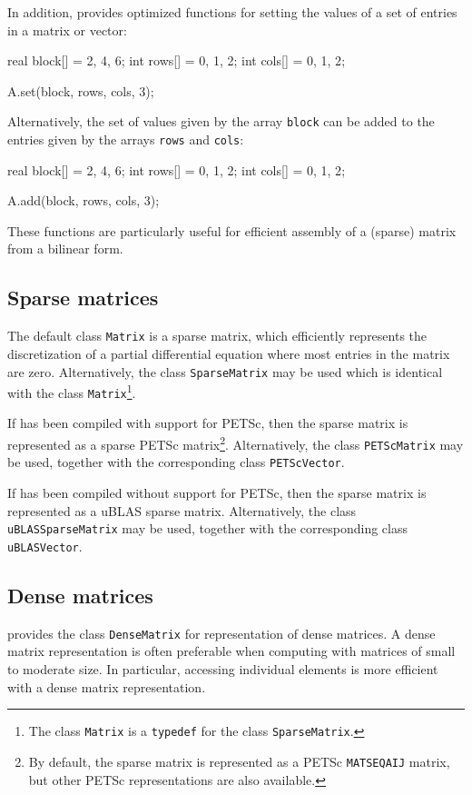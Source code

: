 In addition, \dolfin{} provides optimized functions for setting the
values of a set of entries in a matrix or vector:
\begin{code}
real block[] = {2, 4, 6};
int rows[] = {0, 1, 2};
int cols[] = {0, 1, 2};
  
A.set(block, rows, cols, 3);
\end{code}
Alternatively, the set of values given by the array \texttt{block} can
be added to the entries given by the arrays \texttt{rows} and
\texttt{cols}:
\begin{code}
real block[] = {2, 4, 6};
int rows[] = {0, 1, 2};
int cols[] = {0, 1, 2};
  
A.add(block, rows, cols, 3);
\end{code}
These functions are particularly useful for efficient assembly of a (sparse)
matrix from a bilinear form.

\subsection{Sparse matrices}

The default \dolfin{} class \texttt{Matrix} is a sparse matrix, which
efficiently represents the discretization of a partial differential
equation where most entries in the matrix are zero. Alternatively,
the class \texttt{SparseMatrix} may be used which is identical with
the class \texttt{Matrix}\footnote{The class \texttt{Matrix} is a
\texttt{typedef} for the class \texttt{SparseMatrix}.}.

If \dolfin{} has been compiled with support for PETSc, then the sparse
matrix is represented as a sparse PETSc matrix\footnote{By default, the
sparse matrix is represented as a PETSc \texttt{MATSEQAIJ} matrix, but
other PETSc representations are also available.}. Alternatively, the
class \texttt{PETScMatrix} may be used, together with the corresponding
class \texttt{PETScVector}.

If \dolfin{} has been compiled without support for PETSc, then the
sparse matrix is represented as a uBLAS sparse matrix. Alternatively,
the class \texttt{uBLASSparseMatrix} may be used, together with the
corresponding class \texttt{uBLASVector}.

\subsection{Dense matrices}

\dolfin{} provides the class \texttt{DenseMatrix} for representation
of dense matrices. A dense matrix representation is often preferable
when computing with matrices of small to moderate size. In particular,
accessing individual elements 
is more efficient with a dense matrix representation.

